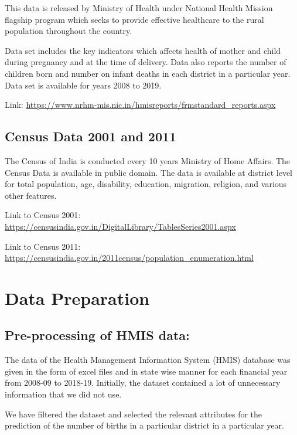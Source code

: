 \documentclass[]{article}
\begin{document}
This data is released by Ministry of Health under National Health Mission flagship program which seeks to provide effective healthcare to the rural population throughout the country.

\bigskip

Data set includes the key indicators which affects health of mother and child during pregnancy and at the time of delivery. Data also reports the number of children born and number on infant deaths in each district in a particular year. Data set is available for years 2008 to 2019.

\bigskip

Link: \url{https://www.nrhm-mis.nic.in/hmisreports/frmstandard_reports.aspx}
   
\subsection{Census Data 2001 and 2011}

The Census of India is conducted every 10 years Ministry of Home Affairs. The Census Data is available in public domain. The data is available at district level for total population, age, disability, education, migration, religion, and various other features.

\medskip

Link to Census 2001: \url{https://censusindia.gov.in/DigitalLibrary/TablesSeries2001.aspx}

\medskip

Link to Census 2011: \url{https://censusindia.gov.in/2011census/population_enumeration.html}
    
\section{Data Preparation}

\subsection{Pre-processing of HMIS data:}

The data of the Health Management Information System (HMIS) database was given in the form of excel files and in state wise manner for each financial year from 2008-09 to 2018-19. Initially, the dataset contained a lot of unnecessary information that we did not use.

\bigskip

We have filtered the dataset and selected the relevant attributes for the prediction of the number of births in a particular district in a particular year.
\end{document}
